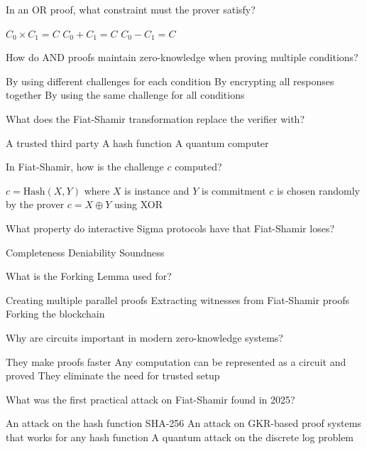 \documentclass[10pt,a4paper,american]{exam}
\begin{document}
\begin{questions}
	\question In an OR proof, what constraint must the prover satisfy?
	\begin{randomizechoices}
		\choice $C_0 \times C_1 = C$
		\CorrectChoice $C_0 + C_1 = C$
		\choice $C_0 - C_1 = C$
	\end{randomizechoices}

	\question How do AND proofs maintain zero-knowledge when proving multiple conditions?
	\begin{randomizechoices}
		\choice By using different challenges for each condition
		\choice By encrypting all responses together
		\CorrectChoice By using the same challenge for all conditions
	\end{randomizechoices}

	\question What does the Fiat-Shamir transformation replace the verifier with?
	\begin{randomizechoices}
		\choice A trusted third party
		\CorrectChoice A hash function
		\choice A quantum computer
	\end{randomizechoices}

	\question In Fiat-Shamir, how is the challenge $c$ computed?
	\begin{randomizechoices}
		\CorrectChoice $c = \text{Hash}(X, Y)$ where $X$ is instance and $Y$ is commitment
		\choice $c$ is chosen randomly by the prover
		\choice $c = X \oplus Y$ using XOR
	\end{randomizechoices}

	\question What property do interactive Sigma protocols have that Fiat-Shamir loses?
	\begin{randomizechoices}
		\choice Completeness
		\CorrectChoice Deniability
		\choice Soundness
	\end{randomizechoices}

	\question What is the Forking Lemma used for?
	\begin{randomizechoices}
		\choice Creating multiple parallel proofs
		\CorrectChoice Extracting witnesses from Fiat-Shamir proofs
		\choice Forking the blockchain
	\end{randomizechoices}

	\question Why are circuits important in modern zero-knowledge systems?
	\begin{randomizechoices}
		\choice They make proofs faster
		\CorrectChoice Any computation can be represented as a circuit and proved
		\choice They eliminate the need for trusted setup
	\end{randomizechoices}

	\question What was the first practical attack on Fiat-Shamir found in 2025?
	\begin{randomizechoices}
		\choice An attack on the hash function SHA-256
		\CorrectChoice An attack on GKR-based proof systems that works for any hash function
		\choice A quantum attack on the discrete log problem
	\end{randomizechoices}


\end{questions}
\end{document}
